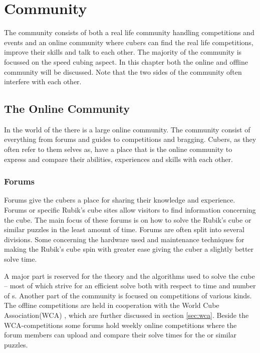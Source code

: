 \chapter{Community}

The \rubik{} community consists of both a real life community handling competitions and events and an online community where cubers can find the real life competitions, improve their skills and talk to each other. The majority of the community is focussed on the speed cubing aspect. In this chapter both the online and offline community will be discussed. Note that the two sides of the community often interfere with each other. 

\section{The Online Community}
In the world of the \rubik{} there is a large online community. The community consist of everything from forums and guides to competitions and bragging. Cubers, as they often refer to them selves as, have a place that is the online community to express and compare their abilities, experiences and skills with each other. 

\subsection{Forums}
Forums give the cubers a place for sharing their knowledge and experience\cite{speedsolving.com}\cite{speedcubing.dk}\cite{wca}. Forums or specific Rubik's cube sites allow visitors to find information concerning the cube. The main focus of these forums is on how to solve the Rubik's cube or similar puzzles in the least amount of time. Forums are often split into several divisions. Some concerning the hardware used and maintenance techniques for making the Rubik's cube spin with greater ease giving the cuber a slightly better solve time.

A major part is reserved for the theory and the algorithms used to solve the cube -- most of which strive for an efficient solve both with respect to time and number of \twist{}s.
Another part of the community is focused on competitions of various kinds. The offline competitions are held in cooperation with the World Cube Association(WCA) \cite{wca}, which are further discussed in section \ref{sec:wca}. Beside the WCA-competitions some forums hold weekly online competitions where the forum members can upload and compare their solve times for the \rubik{} or similar puzzles. 

